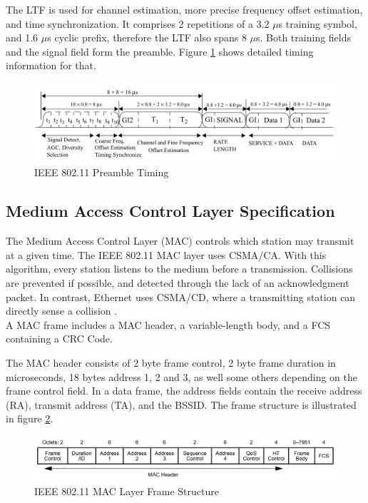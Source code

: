 The \gls{LTF} is used for channel estimation, more precise frequency offset estimation, and time synchronization. It comprises 2 repetitions of a 3.2 $\mu$s training symbol, and 1.6 $\mu$s cyclic prefix, therefore the \gls{LTF} also spans 8 $\mu$s. Both training fields and the signal field form the preamble. Figure \ref{fig:preamble} shows detailed timing information for that.

\begin{figure}[H]
	\centering
	\includegraphics[width=\textwidth]{gfx/images/preamble-format}
	\caption[IEEE 802.11 Preamble Timing]{IEEE 802.11 Preamble Timing \cite{ieee2012}}
	\label{fig:preamble}
\end{figure}


\subsection{Medium Access Control Layer Specification} \label{sec:mac-format}

The Medium Access Control Layer (MAC) controls which station may transmit at a given time. The \gls{IEEE} 802.11 \gls{MAC} layer uses \gls{CSMA/CA}. With this algorithm, every station listens to the medium before a transmission. Collisions are prevented if possible, and detected through the lack of an acknowledgment packet. In contrast, Ethernet uses \gls{CSMA/CD}, where a transmitting station can directly sense a collision \cite{ieee802-3}.\\

A \gls{MAC} frame includes a \gls{MAC} header, a variable-length body, and a \gls{FCS} containing a \gls{CRC} Code.

The \gls{MAC} header consists of 2 byte frame control, 2 byte frame duration in microseconds, 18 bytes address 1, 2 and 3, as well some others depending on the frame control field. In a data frame, the address fields contain the receive address (RA), transmit address (TA), and the \gls{BSSID}. The frame structure is illustrated in figure \ref{fig:mac-format}.

\begin{figure}[H]
	\centering
	\includegraphics[width=\textwidth]{gfx/images/mac-format}
	\caption[IEEE 802.11 \gls{MAC} Layer Frame Structure]{IEEE 802.11 \gls{MAC} Layer Frame Structure \cite{ieee2012}}
	\label{fig:mac-format}
\end{figure}


